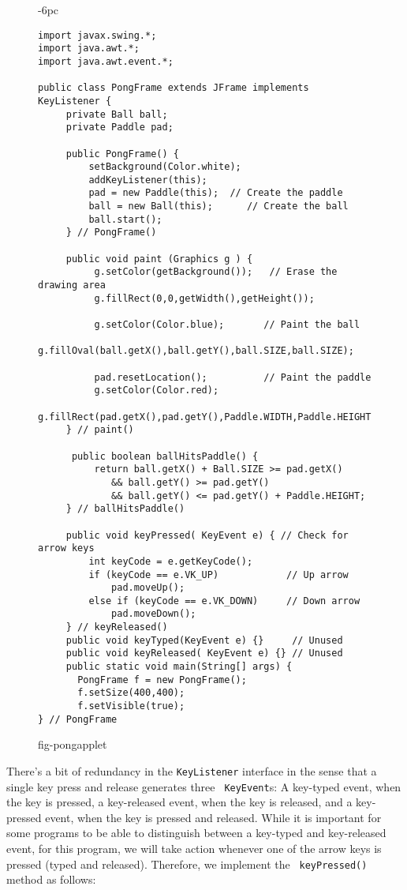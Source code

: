 \begin{figure}[p]
\jjjprogstart
\begin{jjjlistingleft}[32pc]{-6pc}
\begin{lstlisting}
import javax.swing.*;
import java.awt.*;
import java.awt.event.*;

public class PongFrame extends JFrame implements KeyListener {
     private Ball ball;
     private Paddle pad;

     public PongFrame() {
         setBackground(Color.white);
         addKeyListener(this);
         pad = new Paddle(this);  // Create the paddle
         ball = new Ball(this);      // Create the ball
         ball.start();
     } // PongFrame()

     public void paint (Graphics g ) {
          g.setColor(getBackground());   // Erase the drawing area
          g.fillRect(0,0,getWidth(),getHeight());

          g.setColor(Color.blue);       // Paint the ball
          g.fillOval(ball.getX(),ball.getY(),ball.SIZE,ball.SIZE);

          pad.resetLocation();          // Paint the paddle
          g.setColor(Color.red);
          g.fillRect(pad.getX(),pad.getY(),Paddle.WIDTH,Paddle.HEIGHT);
     } // paint()

      public boolean ballHitsPaddle() {
          return ball.getX() + Ball.SIZE >= pad.getX()
             && ball.getY() >= pad.getY()
             && ball.getY() <= pad.getY() + Paddle.HEIGHT;
     } // ballHitsPaddle()

     public void keyPressed( KeyEvent e) { // Check for arrow keys
         int keyCode = e.getKeyCode();
         if (keyCode == e.VK_UP)            // Up arrow
             pad.moveUp();
         else if (keyCode == e.VK_DOWN)     // Down arrow
             pad.moveDown();
     } // keyReleased()
     public void keyTyped(KeyEvent e) {}     // Unused
     public void keyReleased( KeyEvent e) {} // Unused
     public static void main(String[] args) {
       PongFrame f = new PongFrame();
       f.setSize(400,400);
       f.setVisible(true);
} // PongFrame
\end{lstlisting}
\end{jjjlistingleft}
{fig-pongapplet}
\end{figure}

There's a bit of redundancy in the {\tt KeyListener} interface in the
sense that a single key press and release generates three {\tt
KeyEvent}s: A key-typed event, when the key is pressed, a key-released
event, when the key is released, and a key-pressed event, when the key
is pressed and released.  While it is important for some programs to
be able to distinguish between a key-typed and key-released event, for
this program, we will take action whenever one of the arrow keys is
pressed (typed and released). Therefore, we implement the {\tt
keyPressed()} method as follows:

